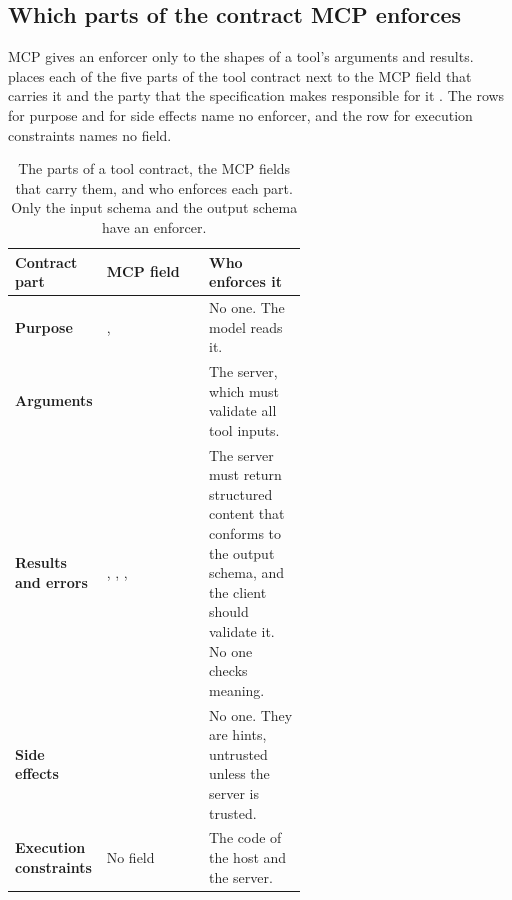 \subsection{Which parts of the contract MCP enforces}
\label{sec:mcpcontract-enforce}

MCP gives an enforcer only to the shapes of a tool's arguments and results.
 places each of the five parts of the tool contract next to the MCP
field that carries it and the party that the specification makes responsible for it
\citep{mcp-spec-2026}. The rows for purpose and for side effects name no enforcer, and the row for
execution constraints names no field.

\begin{table}[htbp]
  \caption{The parts of a tool contract, the MCP fields that carry them, and who enforces each
  part. Only the input schema and the output schema have an enforcer.}
  \label{tab:mcpcontract-enforce}
  \begin{adjustbox}{width=\linewidth}\begin{tabularx}{\linewidth}{L{0.23\linewidth}L{0.35\linewidth}X}
    \toprule
    \textbf{Contract part} & \textbf{MCP field} & \textbf{Who enforces it} \\
    \midrule
    \textbf{Purpose} & ,  & No one. The model reads it. \\
    \textbf{Arguments} &  & The server, which must validate all tool inputs. \\
    \textbf{Results and errors} & , , ,  & The server must return structured content that conforms to the output schema, and the client should validate it. No one checks meaning. \\
    \textbf{Side effects} &  & No one. They are hints, untrusted unless the server is trusted. \\
    \textbf{Execution constraints} & No field & The code of the host and the server. \\
    \bottomrule
  \end{tabularx}\end{adjustbox}
\end{table}

